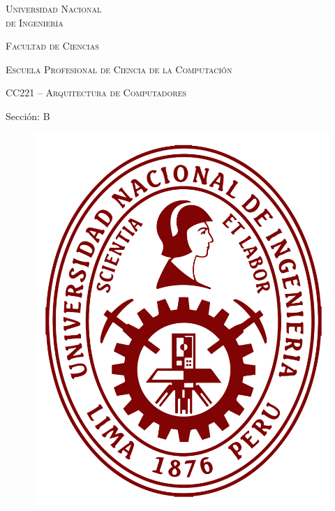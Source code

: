 \documentclass[../main]{subfiles}
\begin{document}
\begin{titlepage}
	\vspace*{\fill}
	\begin{center}
		{\huge\scshape Universidad Nacional\\de Ingeniería }

		\vspace{5mm}

		{\LARGE\scshape Facultad de Ciencias }

		\vspace{5mm}

		{\Large\scshape Escuela Profesional de Ciencia de la Computación }

		\vspace{5mm}

		{\large\scshape
			CC221 -- Arquitectura de Computadores

			Sección: B
		}

		\vspace{5mm}

		\begin{figure}[H]
			\centering
			\includegraphics[height=0.3\textheight]{res/UNI_Logo.png}
		\end{figure}


\end{center}
\end{titlepage}
\end{document}
